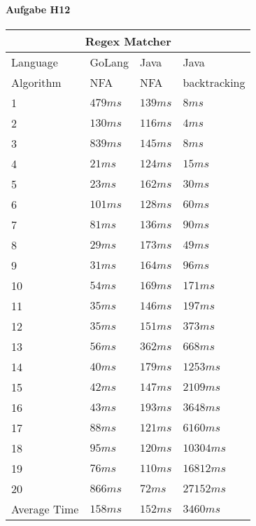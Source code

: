 \documentclass[11pt]{article}
\begin{document}
\paragraph{Aufgabe H12}
\begin{center}
\begin{tabular}{ |p{3cm}||p{2cm}|p{2cm}|p{2cm}|  }
 \hline
 \multicolumn{4}{|c|}{Regex Matcher} \\
 \hline
 Language & GoLang & Java & Java\\
 \hline
 Algorithm & NFA & NFA & backtracking\\
 \hline
 1	&	$479 ms$	&	$139 ms$	&	$8 ms$\\
 2	&	$130 ms$	&	$116 ms$	&	$4 ms$\\
 3	&	$839 ms$	&	$145 ms$	&	$8 ms$\\
 4	&	$21 ms$	&	$124 ms$	&	$15 ms$\\
 5	&	$23 ms$	&	$162 ms$	&	$30 ms$\\
 6	&	$101 ms$	&	$128 ms$	&	$60 ms$\\
 7	&	$81 ms$	&	$136 ms$	&	$90 ms$\\
 8	&	$29 ms$	&	$173 ms$	&	$49 ms$\\
 9	&	$31 ms$	&	$164 ms$	&	$96 ms$\\
 10	&	$54 ms$	&	$169 ms$	&	$171 ms$\\
 11	&	$35 ms$	&	$146 ms$	&	$197 ms$\\
 12	&	$35 ms$	&	$151 ms$	&	$373 ms$\\
 13	&	$56 ms$	&	$362 ms$	&	$668 ms$\\
 14	&	$40 ms$	&	$179 ms$	&	$1253 ms$\\
 15	&	$42 ms$	&	$147 ms$	&	$2109 ms$\\
 16	&	$43 ms$	&	$193 ms$	&	$3648 ms$\\
 17	&	$88 ms$	&	$121 ms$	&	$6160 ms$\\
 18	&	$95 ms$	&	$120 ms$	&	$10304 ms$\\
 19	&	$76 ms$	&	$110 ms$	&	$16812 ms$\\
 20	&	$866 ms$	&	$72 ms$	&	$27152 ms$\\
 \hline
 Average Time	&	$158 ms$	&	$152 ms$	&	$3460 ms$\\
 \hline
\end{tabular}
\end{center}
\end{document}
